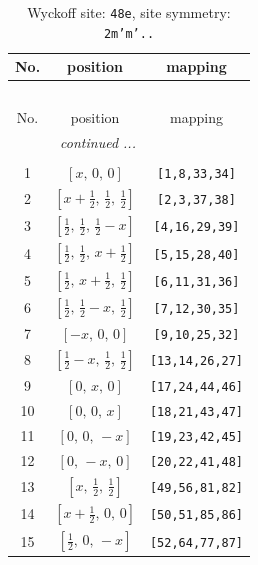 \documentclass[fleqn,8pt]{jsarticle}
\begin{document}
\begin{longtable}{ccc}
\caption{Wyckoff site: {\tt 48e}, site symmetry: {\tt 2m'm'..}}
 \\
 \hline \hline
No. & position & mapping \\ \hline \endfirsthead

\multicolumn{2}{l}{\tablename\ \thetable{}} \\
 \hline \hline
No. & position & mapping \\ \hline \endhead

 \hline \hline
\multicolumn{2}{r}{\footnotesize\it continued ...} \\ \endfoot

 \hline \hline
\multicolumn{2}{r}{} \\ \endlastfoot

1 & $\left[ x,\, 0,\, 0 \right]$ & {\tt [1,8,33,34]} \\ \hline
2 & $\left[ x + \frac{1}{2},\, \frac{1}{2},\, \frac{1}{2} \right]$ & {\tt [2,3,37,38]} \\ \hline
3 & $\left[ \frac{1}{2},\, \frac{1}{2},\, \frac{1}{2} - x \right]$ & {\tt [4,16,29,39]} \\ \hline
4 & $\left[ \frac{1}{2},\, \frac{1}{2},\, x + \frac{1}{2} \right]$ & {\tt [5,15,28,40]} \\ \hline
5 & $\left[ \frac{1}{2},\, x + \frac{1}{2},\, \frac{1}{2} \right]$ & {\tt [6,11,31,36]} \\ \hline
6 & $\left[ \frac{1}{2},\, \frac{1}{2} - x,\, \frac{1}{2} \right]$ & {\tt [7,12,30,35]} \\ \hline
7 & $\left[ - x,\, 0,\, 0 \right]$ & {\tt [9,10,25,32]} \\ \hline
8 & $\left[ \frac{1}{2} - x,\, \frac{1}{2},\, \frac{1}{2} \right]$ & {\tt [13,14,26,27]} \\ \hline
9 & $\left[ 0,\, x,\, 0 \right]$ & {\tt [17,24,44,46]} \\ \hline
10 & $\left[ 0,\, 0,\, x \right]$ & {\tt [18,21,43,47]} \\ \hline
11 & $\left[ 0,\, 0,\, - x \right]$ & {\tt [19,23,42,45]} \\ \hline
12 & $\left[ 0,\, - x,\, 0 \right]$ & {\tt [20,22,41,48]} \\ \hline
13 & $\left[ x,\, \frac{1}{2},\, \frac{1}{2} \right]$ & {\tt [49,56,81,82]} \\ \hline
14 & $\left[ x + \frac{1}{2},\, 0,\, 0 \right]$ & {\tt [50,51,85,86]} \\ \hline
15 & $\left[ \frac{1}{2},\, 0,\, - x \right]$ & {\tt [52,64,77,87]} \\ \hline

\end{longtable}
\end{document}
